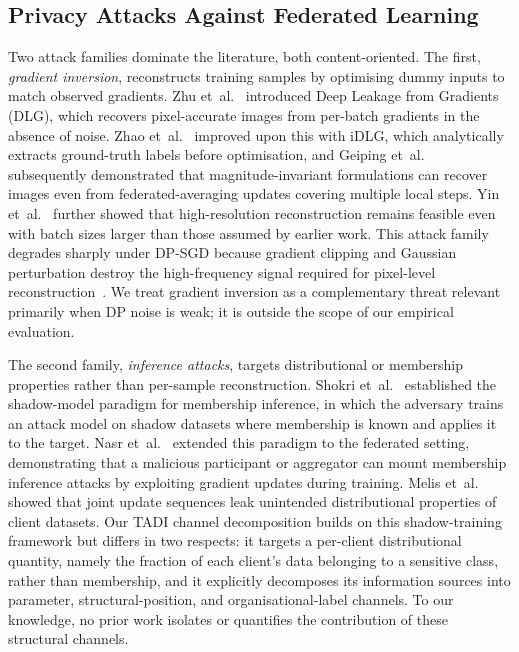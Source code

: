 \documentclass[letterpaper,journal]{IEEEtran}
\newcommand{\TADI}{\textsc{TADI}\xspace}
\begin{document}
\subsection{Privacy Attacks Against Federated Learning}
\label{sec:related-attacks}

Two attack families dominate the literature, both content-oriented.
The first, \textit{gradient inversion}, reconstructs training samples
by optimising dummy inputs to match observed gradients. Zhu
et~al.~\cite{zhu2019dlg} introduced Deep Leakage from Gradients
(DLG), which recovers pixel-accurate images from per-batch gradients
in the absence of noise. Zhao et~al.~\cite{zhao2020idlg} improved
upon this with iDLG, which analytically extracts ground-truth labels
before optimisation, and Geiping et~al.~\cite{geiping2020inverting}
subsequently demonstrated that magnitude-invariant formulations can
recover images even from federated-averaging updates covering
multiple local steps. Yin et~al.~\cite{yin2021gradinversion} further
showed that high-resolution reconstruction remains feasible even with
batch sizes larger than those assumed by earlier work. This attack
family degrades sharply under DP-SGD because gradient clipping and
Gaussian perturbation destroy the high-frequency signal required for
pixel-level reconstruction~\cite{fowl2022robbing}. We treat gradient
inversion as a complementary threat relevant primarily when DP noise
is weak; it is outside the scope of our empirical evaluation.

The second family, \textit{inference attacks}, targets distributional
or membership properties rather than per-sample reconstruction.
Shokri et~al.~\cite{shokri2017membership} established the
shadow-model paradigm for membership inference, in which the
adversary trains an attack model on shadow datasets where membership
is known and applies it to the target. Nasr
et~al.~\cite{nasr2019comprehensive} extended this paradigm to the
federated setting, demonstrating that a malicious participant or
aggregator can mount membership inference attacks by exploiting
gradient updates during training. Melis
et~al.~\cite{melis2019exploiting} showed that joint update sequences
leak unintended distributional properties of client datasets. Our
\TADI channel decomposition builds on this shadow-training framework
but differs in two respects: it targets a per-client distributional
quantity, namely the fraction of each client's data belonging to a
sensitive class, rather than membership, and it explicitly
decomposes its information sources into parameter,
structural-position, and organisational-label channels. To our
knowledge, no prior work isolates or quantifies the contribution of
these structural channels.
\end{document}
